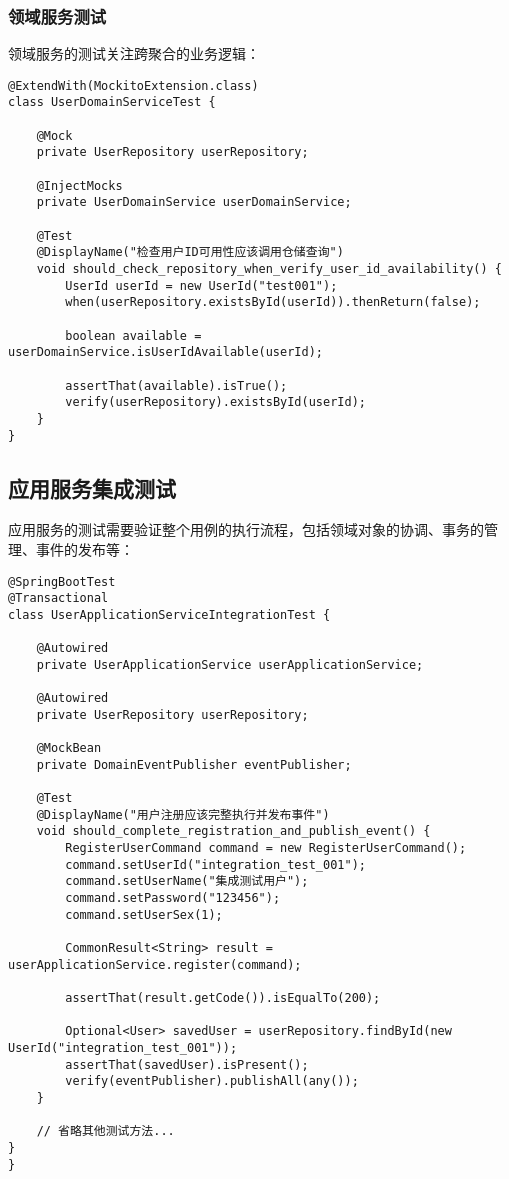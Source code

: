 \documentclass[a4paper,12pt]{article}
\begin{document}
\subsubsection{领域服务测试}

领域服务的测试关注跨聚合的业务逻辑：

\begin{lstlisting}[caption=用户领域服务测试]
@ExtendWith(MockitoExtension.class)
class UserDomainServiceTest {
    
    @Mock
    private UserRepository userRepository;
    
    @InjectMocks
    private UserDomainService userDomainService;
    
    @Test
    @DisplayName("检查用户ID可用性应该调用仓储查询")
    void should_check_repository_when_verify_user_id_availability() {
        UserId userId = new UserId("test001");
        when(userRepository.existsById(userId)).thenReturn(false);
        
        boolean available = userDomainService.isUserIdAvailable(userId);
        
        assertThat(available).isTrue();
        verify(userRepository).existsById(userId);
    }
}
\end{lstlisting}

\subsection{应用服务集成测试}

应用服务的测试需要验证整个用例的执行流程，包括领域对象的协调、事务的管理、事件的发布等：

\begin{lstlisting}[caption=用户应用服务集成测试]
@SpringBootTest
@Transactional
class UserApplicationServiceIntegrationTest {
    
    @Autowired
    private UserApplicationService userApplicationService;
    
    @Autowired
    private UserRepository userRepository;
    
    @MockBean
    private DomainEventPublisher eventPublisher;
    
    @Test
    @DisplayName("用户注册应该完整执行并发布事件")
    void should_complete_registration_and_publish_event() {
        RegisterUserCommand command = new RegisterUserCommand();
        command.setUserId("integration_test_001");
        command.setUserName("集成测试用户");
        command.setPassword("123456");
        command.setUserSex(1);
        
        CommonResult<String> result = userApplicationService.register(command);
        
        assertThat(result.getCode()).isEqualTo(200);
        
        Optional<User> savedUser = userRepository.findById(new UserId("integration_test_001"));
        assertThat(savedUser).isPresent();
        verify(eventPublisher).publishAll(any());
    }
    
    // 省略其他测试方法...
}
}
\end{lstlisting}
\end{document}
